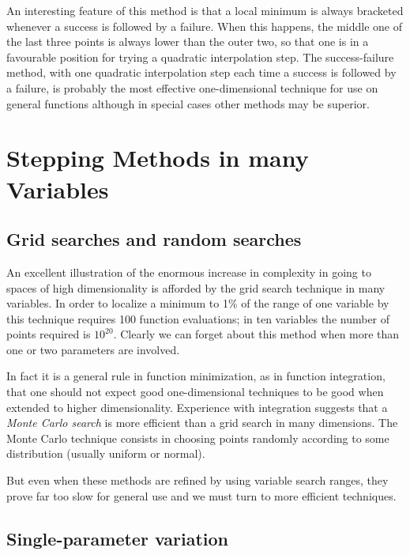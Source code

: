      An interesting feature of this method is that a local minimum is
always bracketed whenever a success is followed by a failure.  When this
happens, the middle one of the last three points is always lower than
the outer two, so that one is in a favourable position for trying a
quadratic
interpolation step.  The success-failure method, with one quadratic
interpolation step each time a success is followed by a failure, is
probably
the most effective one-dimensional technique for use on general functions
although in special cases other methods may be superior.
 
\chapter{Stepping Methods in many Variables}
\section{Grid searches and random searches}
 
   An excellent illustration of the enormous increase in complexity in
going to spaces of high dimensionality is afforded by the grid search
technique in many variables. In order to localize a minimum to 1\% of
the range of one variable by this technique requires 100 function
evaluations; in ten variables the number of points required is $10^{20}$.
Clearly we can forget about this method when more than one or
two parameters are involved.
 
In fact it is a general rule in function minimization, as in
function integration, that one should not expect good one-dimensional
techniques to be good when extended to higher dimensionality. Experience
with integration suggests that a {\em Monte Carlo search} is more efficient
than a grid search in many dimensions. The Monte Carlo technique
consists in
choosing points randomly according to some distribution
   (usually uniform or normal).
 
        But even when these methods are refined by using variable search
   ranges, they prove far too slow for general use and we must turn to more
   efficient techniques.
 
 \section{Single-parameter variation}
 
